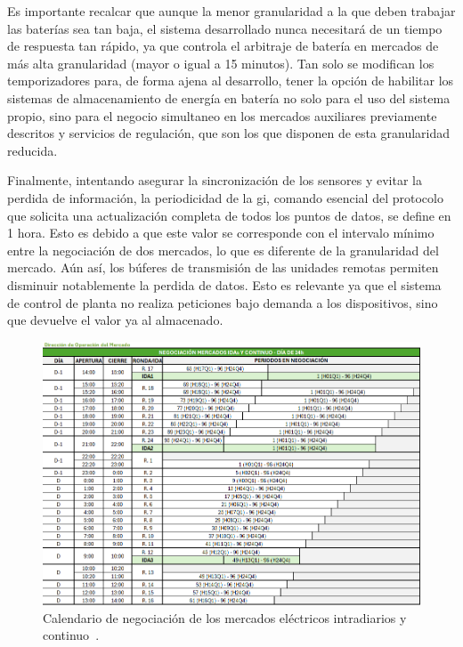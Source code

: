 Es importante recalcar que aunque la menor granularidad a la que deben trabajar las baterías sea tan baja, el sistema desarrollado nunca necesitará de un tiempo de respuesta tan rápido, ya que controla el arbitraje de batería en mercados de más alta granularidad (mayor o igual a 15 minutos). Tan solo se modifican los temporizadores para, de forma ajena al desarrollo, tener la opción de habilitar los sistemas de almacenamiento de energía en batería no solo para el uso del sistema propio, sino para el negocio simultaneo en los mercados auxiliares previamente descritos y servicios de regulación, que son los que disponen de esta granularidad reducida.

Finalmente, intentando asegurar la sincronización de los sensores y evitar la perdida de información, la periodicidad de la \gls{gi}, comando esencial del protocolo que solicita una actualización completa de todos los puntos de datos, se define en 1 hora. Esto es debido a que este valor se corresponde con el intervalo mínimo entre la negociación de dos mercados, lo que es diferente de la granularidad del mercado. Aún así, los búferes de transmisión de las unidades remotas permiten disminuir notablemente la perdida de datos. Esto es relevante ya que el sistema de control de planta no realiza peticiones bajo demanda a los dispositivos, sino que devuelve el valor ya al almacenado.

\begin{figure}
  \centering
  \includegraphics[width=0.75\linewidth]{figures/tiempo-mercados.png}
  \caption[Calendario de negociación de los mercados eléctricos.]{Calendario de negociación de los mercados eléctricos intradiarios y continuo~\cite{omie2025mercado}.}%
  \label{fig:tiempo-mercados}
\end{figure}

